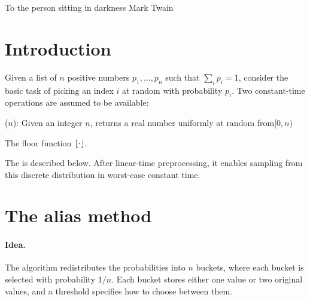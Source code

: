 %





\ChapterPrefix{}
\ChapterGen{}

%
{To the person sitting in darkness}%
{Mark Twain}


\providecommand{\AInewX}[1]{\textcolor{red}{\textbf{NEW:} #1}}
\providecommand{\AIdelX}[1]{\textcolor{green}{\textbf{DEL:} #1}}
\providecommand{\AIcommentX}[1]{\textcolor{blue}{\textbf{COMMENT:} #1}}

\section{Introduction}

Given a list of $n$ positive numbers $p_1, \ldots, p_n$ such that $\sum_i p_i = 1$, consider the basic task of picking an index $i$ at random with probability $p_i$. Two constant-time operations are assumed to be available:
\begin{compactenumI}
    \smallskip%
    \item {}($n$): Given an integer $n$, returns a real
    number uniformly at random from$[0,n)$
  
    \smallskip%
    \item The floor function $\left\lfloor { \cdot } \right\rfloor$.
\end{compactenumI}
\smallskip%
The  is described below. After linear-time
preprocessing, it enables sampling from this discrete distribution in
worst-case constant time.

\section{The alias method}

\paragraph*{Idea.}
The algorithm redistributes the probabilities into $n$ buckets, where each bucket is selected with probability $1/n$. Each bucket stores either one value or two original values, and a threshold specifies how to choose between them.

